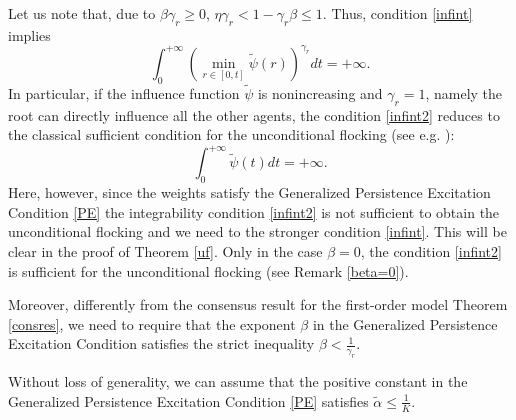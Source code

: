 \documentclass[11pt]{article}
\begin{document}
\begin{oss}\label{condizioneintegrale}
Let us note that, due to $\beta\gamma_r\geq 0$, $\eta\gamma_r<1-\gamma_r\beta\leq 1$. Thus, condition \eqref{infint} implies
\begin{equation}\label{infint2}
    \int_{0}^{+\infty}\left(\min_{r\in [0,t]}\tilde\psi(r)\right)^{\gamma_r}dt=+\infty.
\end{equation}
	In particular, if the influence function $\tilde\psi$ is nonincreasing and $\gamma_r=1$, namely the root can directly influence all the other agents, the condition \eqref{infint2} reduces to 
    the classical sufficient condition for the unconditional flocking (see e.g. \cite{Ha1}):
    \begin{equation}\label{unflockcond}
    \int_{0}^{+\infty}\tilde\psi(t)dt=+\infty.
    \end{equation}
	Here, however, since the weights satisfy the Generalized Persistence Excitation Condition \eqref{PE} the integrability condition \eqref{infint2} is not sufficient to obtain the unconditional flocking {and we need to the stronger condition \eqref{infint}. This will be clear in the proof of Theorem \ref{uf}.} Only in the case $\beta=0$, the condition \eqref{infint2} is sufficient for the unconditional flocking (see Remark \ref{beta=0}).  

    Moreover, differently from the consensus result for the first-order model Theorem \ref{consres}, {we need to require that the exponent $\beta$ in the Generalized Persistence Excitation Condition satisfies the strict inequality $\beta<\frac{1}{\gamma_r}$.}
\end{oss}
\begin{oss}
    Without loss of generality, we can assume that the positive constant in the Generalized Persistence Excitation Condition \eqref{PE} satisfies $\tilde{\alpha}\leq \frac{1}{K}$.
\end{oss}
\end{document}
